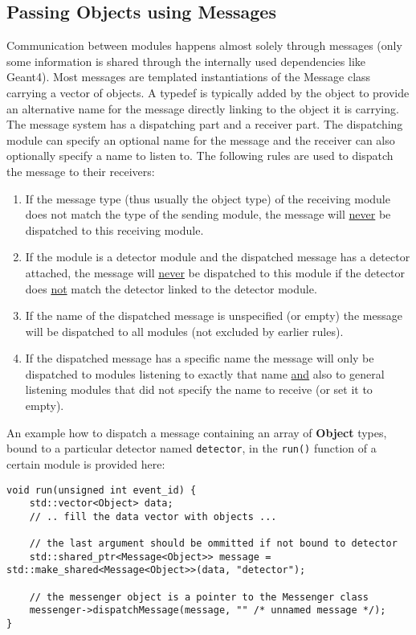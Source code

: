 \subsection{Passing Objects using Messages}
\label{sec:objects_messages}
Communication between modules happens almost solely through messages (only some information is shared through the internally used dependencies like Geant4). Most messages are templated instantiations of the Message class carrying a vector of objects. A typedef is typically added by the object to provide an alternative name for the message directly linking to the object it is carrying. The message system has a dispatching part and a receiver part. The dispatching module can specify an optional name for the message and the receiver can also optionally specify a name to listen to. The following rules are used to dispatch the message to their receivers:
\begin{enumerate}
\item If the message type (thus usually the object type) of the receiving module does not match the type of the sending module, the message will \underline{never} be dispatched to this receiving module.
\item If the module is a detector module and the dispatched message has a detector attached, the message will \underline{never} be dispatched to this module if the detector does \underline{not} match the detector linked to the detector module.
\item If the name of the dispatched message is unspecified (or empty) the message will be dispatched to all modules (not excluded by earlier rules).
\item If the dispatched message has a specific name the message will only be dispatched to modules listening to exactly that name \underline{and} also to general listening modules that did not specify the name to receive (or set it to empty).
\end{enumerate}

An example how to dispatch a message containing an array of \textbf{Object} types, bound to a particular detector named \texttt{detector}, in the \texttt{run()} function of a certain module is provided here:
\begin{verbatim}
void run(unsigned int event_id) {
    std::vector<Object> data;
    // .. fill the data vector with objects ...
    
    // the last argument should be ommitted if not bound to detector
    std::shared_ptr<Message<Object>> message = std::make_shared<Message<Object>>(data, "detector");
    
    // the messenger object is a pointer to the Messenger class
    messenger->dispatchMessage(message, "" /* unnamed message */);
}
\end{verbatim}

